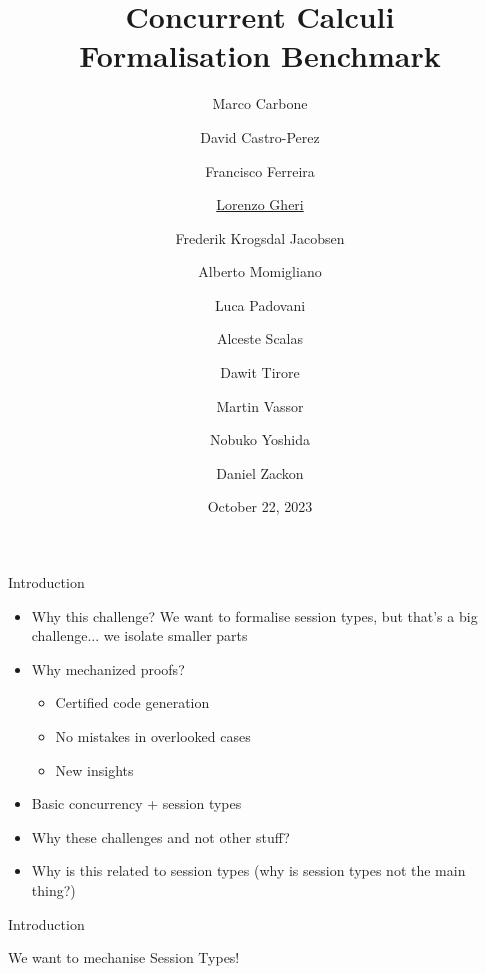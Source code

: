 \documentclass[aspectratio=169,hyperref={pdfpagelabels=false}]{beamer}
\title[Concurrent Calculi Formalisation Benchmark]{\texorpdfstring{Concurrent Calculi\\Formalisation Benchmark}{Concurrent Calculi Formalisation Benchmark}}
\author{Marco Carbone
\and David Castro-Perez
\and Francisco Ferreira
\and \texorpdfstring{\underline{Lorenzo Gheri}}{Lorenzo Gheri}
\and Frederik Krogsdal Jacobsen
\and Alberto Momigliano
\and Luca Padovani
\and Alceste Scalas
\and Dawit Tirore
\and Martin Vassor
\and Nobuko Yoshida
\and Daniel Zackon}
\date{October 22, 2023}
\begin{document}
\inserttitlepage

\begin{frame}{Introduction}
  \begin{itemize}
  \item Why this challenge? We want to formalise session types, but that's a big challenge... we isolate smaller parts
  \item Why mechanized proofs?
    \begin{itemize}
    \item Certified code generation
    \item No mistakes in overlooked cases
    \item New insights
    \end{itemize}
  \item Basic concurrency + session types
  \item Why these challenges and not other stuff?
  \item Why is this related to session types (why is session types not the main thing?)
  \end{itemize}
\end{frame}

\begin{frame}{Introduction}

  We want to mechanise Session Types!

  \ \\

  \ \\
  
\end{frame}
\end{document}
